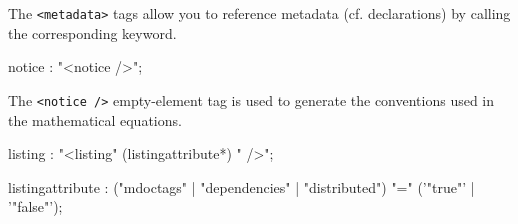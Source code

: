 The \lstinline'<metadata>' tags allow you to reference \faust metadata (cf. declarations) by calling the corresponding keyword.


\begin{rail}
notice : "<notice />";
\end{rail}

The \lstinline'<notice />' empty-element tag is used to generate the conventions used in the mathematical equations.
% 

\begin{rail}
listing : "<listing" (listingattribute*) " />";
\end{rail}

\begin{rail}
listingattribute : ("mdoctags" | "dependencies" | "distributed") "=" ('"true"' | '"false"');
\end{rail}


